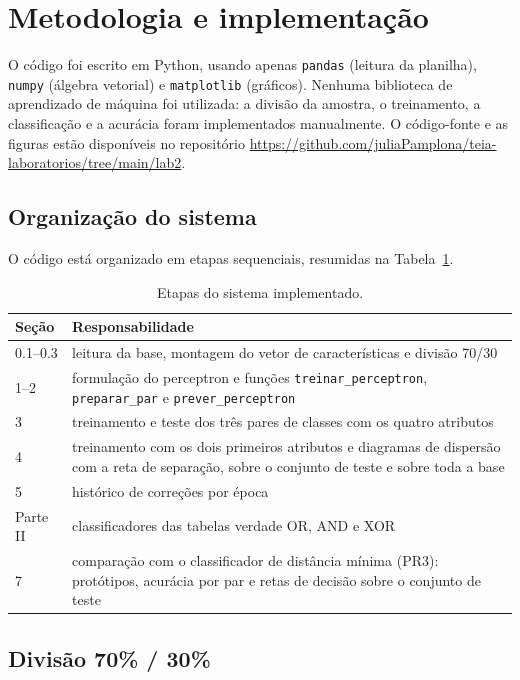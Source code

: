 \documentclass[12pt,a4paper]{article}
\newcommand{\repositorio}{\url{https://github.com/juliaPamplona/teia-laboratorios/tree/main/lab2}}
\begin{document}
\section{Metodologia e implementação}

O código foi escrito em Python, usando apenas \texttt{pandas} (leitura da planilha), \texttt{numpy} (álgebra vetorial) e \texttt{matplotlib} (gráficos). Nenhuma biblioteca de aprendizado de máquina foi utilizada: a divisão da amostra, o treinamento, a classificação e a acurácia foram implementados manualmente. O código-fonte e as figuras estão disponíveis no repositório \repositorio.

\subsection{Organização do sistema}

O código está organizado em etapas sequenciais, resumidas na Tabela~\ref{tab:etapas}.

\begin{table}[H]
\centering
\caption{Etapas do sistema implementado.}
\label{tab:etapas}
\begin{tabular}{lp{10cm}}
\toprule
Seção & Responsabilidade \\
\midrule
0.1--0.3 & leitura da base, montagem do vetor de características e divisão 70/30 \\
1--2     & formulação do perceptron e funções \texttt{treinar\_perceptron}, \texttt{preparar\_par} e \texttt{prever\_perceptron} \\
3        & treinamento e teste dos três pares de classes com os quatro atributos \\
4        & treinamento com os dois primeiros atributos e diagramas de dispersão com a reta de separação, sobre o conjunto de teste e sobre toda a base \\
5        & histórico de correções por época \\
Parte II & classificadores das tabelas verdade OR, AND e XOR \\
7        & comparação com o classificador de distância mínima (PR3): protótipos, acurácia por par e retas de decisão sobre o conjunto de teste \\
\bottomrule
\end{tabular}
\end{table}

\subsection{Divisão 70\% / 30\%}
\end{document}
